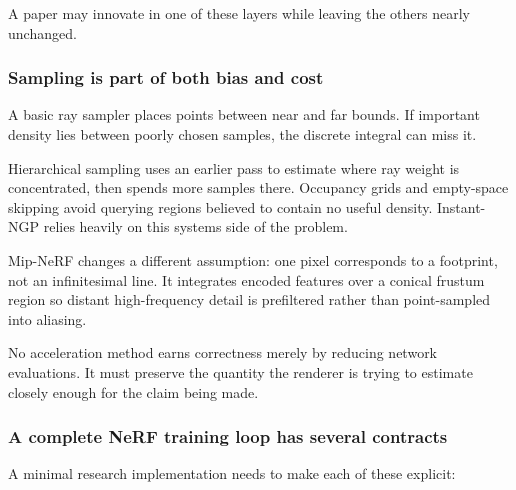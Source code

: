 A paper may innovate in one of these layers while leaving the others nearly unchanged.

\subsubsection{Sampling is part of both bias and cost}\label{04-visual-computing-ii-ch035-sampling-is-part-of-both-bias-and-cost}

A basic ray sampler places points between near and far bounds. If important density lies between poorly chosen samples, the discrete integral can miss it.

Hierarchical sampling uses an earlier pass to estimate where ray weight is concentrated, then spends more samples there. Occupancy grids and empty-space skipping avoid querying regions believed to contain no useful density. Instant-NGP relies heavily on this systems side of the problem.

Mip-NeRF changes a different assumption: one pixel corresponds to a footprint, not an infinitesimal line. It integrates encoded features over a conical frustum region so distant high-frequency detail is prefiltered rather than point-sampled into aliasing.

No acceleration method earns correctness merely by reducing network evaluations. It must preserve the quantity the renderer is trying to estimate closely enough for the claim being made.

\subsubsection{A complete NeRF training loop has several contracts}\label{04-visual-computing-ii-ch035-a-complete-nerf-training-loop-has-several-contracts}

A minimal research implementation needs to make each of these explicit:


